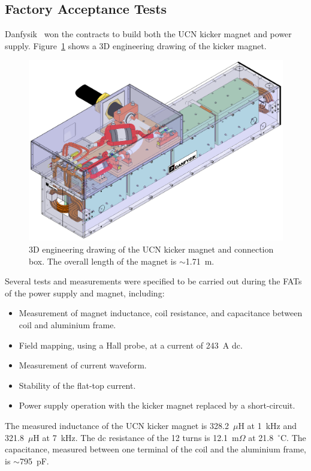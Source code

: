 \documentclass[aps,prab,twocolumn,superscriptaddress]{revtex4-1}
\begin{document}
\subsection{Factory Acceptance Tests}
Danfysik~\cite{Danfysik} won the contracts to build both the UCN kicker magnet and power supply. Figure~\ref{fig:drawing} shows a 3D engineering drawing of the kicker magnet.
\begin{figure}
	\includegraphics[width=\linewidth]{Kicker-paper-15.png}
	\caption{3D engineering drawing of the UCN kicker magnet and connection box. The overall length of the magnet is $\sim$1.71~m.}
	\label{fig:drawing}
\end{figure}
Several tests and measurements were specified to be carried out during the FATs of the power supply and magnet, including:
\begin{itemize}[leftmargin=*]
	\item Measurement of magnet inductance, coil resistance, and capacitance between coil and aluminium frame.
	\item Field mapping, using a Hall probe, at a current of 243~A dc.
	\item Measurement of current waveform.
	\item Stability of the flat-top current.
    \item Power supply operation with the kicker magnet replaced by a short-circuit.

\end{itemize}

The measured inductance of the UCN kicker magnet is 328.2~$\mu$H at 1~kHz and 321.8~$\mu$H at 7~kHz. The dc resistance of the 12 turns is 12.1~m$\Omega$ at 21.8~$^\circ$C. The capacitance, measured between one terminal of the coil and the aluminium frame, is $\sim$795~pF.
\end{document}
